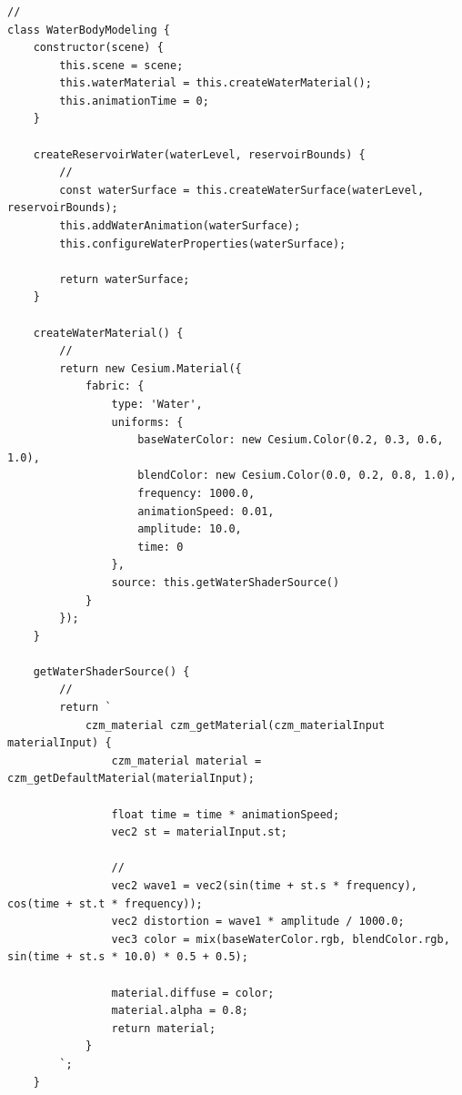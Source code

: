 \subsubsection{}\label{section-23}

\paragraph{}\label{section-24}

\begin{verbatim}
// 
class WaterBodyModeling {
    constructor(scene) {
        this.scene = scene;
        this.waterMaterial = this.createWaterMaterial();
        this.animationTime = 0;
    }
    
    createReservoirWater(waterLevel, reservoirBounds) {
        // 
        const waterSurface = this.createWaterSurface(waterLevel, reservoirBounds);
        this.addWaterAnimation(waterSurface);
        this.configureWaterProperties(waterSurface);
        
        return waterSurface;
    }
    
    createWaterMaterial() {
        // 
        return new Cesium.Material({
            fabric: {
                type: 'Water',
                uniforms: {
                    baseWaterColor: new Cesium.Color(0.2, 0.3, 0.6, 1.0),
                    blendColor: new Cesium.Color(0.0, 0.2, 0.8, 1.0),
                    frequency: 1000.0,
                    animationSpeed: 0.01,
                    amplitude: 10.0,
                    time: 0
                },
                source: this.getWaterShaderSource()
            }
        });
    }
    
    getWaterShaderSource() {
        // 
        return `
            czm_material czm_getMaterial(czm_materialInput materialInput) {
                czm_material material = czm_getDefaultMaterial(materialInput);
                
                float time = time * animationSpeed;
                vec2 st = materialInput.st;
                
                // 
                vec2 wave1 = vec2(sin(time + st.s * frequency), cos(time + st.t * frequency));
                vec2 distortion = wave1 * amplitude / 1000.0;
                vec3 color = mix(baseWaterColor.rgb, blendColor.rgb, sin(time + st.s * 10.0) * 0.5 + 0.5);
                
                material.diffuse = color;
                material.alpha = 0.8;
                return material;
            }
        `;
    }
    

\end{verbatim}
